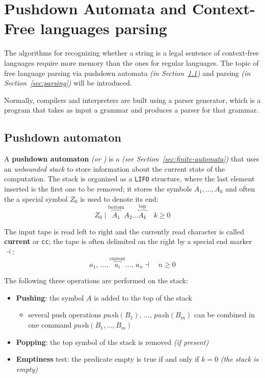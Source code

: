 \documentclass[english]{article}
\begin{document}
\clearpage

\section{Pushdown Automata and Context-Free languages parsing}

The algorithms for recognizing whether a string is a legal sentence of context-free languages require more memory than the ones for regular languages.
The topic of free language parsing via pushdown automata \textit{(in Section~\ref{sec:pushdown-automaton})} and parsing \textit{(in Section~\ref{sec:parsing})} will be introduced.

Normally, compilers and interpreters are built using a parser generator, which is a program that takes as input a grammar and produces a parser for that grammar.

\subsection{Pushdown automaton}
\label{sec:pushdown-automaton}

A \textbf{pushdown automaton} \textit{(or \PDA)} is a \FSA \textit{(see Section~\ref{sec:finite-automata})} that uses an \textit{unbounded stack} to store information about the current state of the computation.
The stack is organized as a \texttt{LIFO} structure, where the last element inserted is the first one to be removed;
it stores the symbols \(A_1, \ldots, A_k\) and often the a special symbol \(Z_0\) is used to denote its end:
\[ Z_0 \mid \overbracket{A_1}^\text{bottom} A_2 \ldots \overbracket{A_k}^\text{top} \quad k \geq 0\]

The input tape is read left to right and the currently read character is called \textbf{current} or \texttt{cc};
the tape is often delimited on the right by a special end marker \(\dashv\):
\[ a_1, \, \ldots, \overbracket{a_i}^{\text{current}} \ldots, \, a_n \dashv \quad n \geq 0 \]

The following three operations are performed on the stack:

\begin{itemize}
  \item \textbf{Pushing}: the symbol \(A\) is added to the top of the stack
        \begin{itemize}[label=\(\rightarrow\)]
          \item several push operations \(\textit{push}(B_1), \, \ldots, \, \textit{push}(B_m)\) can be combined in one command \(\textit{push}(B_1, \ldots, B_m)\)
        \end{itemize}
  \item \textbf{Popping}: the top symbol of the stack is removed \textit{(if present)}
  \item \textbf{Emptiness} test: the predicate empty is true if and only if \(k=0\) \textit{(the stack is empty)}
\end{itemize}
\end{document}

